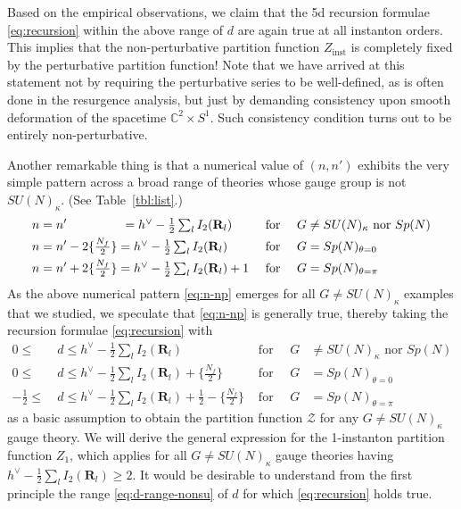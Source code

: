 \documentclass[letterpaper, 11pt]{article}
\newcommand{\nn}{\nonumber}
\def\IC{\mathbb{C}}
\def\k{\kappa}
\begin{document}
{Based on the empirical observations, we claim that the 5d recursion formulae \eqref{eq:recursion} within the above range of $d$ are again true at all instanton orders. This implies that the non-perturbative partition function $Z_\text{inst}$ is completely fixed by the perturbative partition function! Note that we have arrived at this statement not by requiring the perturbative series to be well-defined, as is often done in the resurgence analysis, but just by demanding consistency upon smooth deformation of the spacetime $\IC^2 \times S^1$. Such consistency condition turns out to be entirely non-perturbative.


Another remarkable thing is that a numerical value of  $(n, n')$ exhibits the very simple pattern across a broad range of theories whose gauge group is not $SU(N)_\k$. (See Table~\ref{tbl:list}.)
\begin{align}
  \label{eq:n-np}
 &n = n' \hspace{1.55cm}=\textstyle h^\vee - \frac{1}{2} \sum_{l}I_2(\mathbf{R}_l)  && \text{ for } \quad   G\neq SU(N)_\kappa \text{ nor } Sp(N) \nn\\
 &n = n' - 2\{\tfrac{N_f}{2}\} =\textstyle h^\vee - \frac{1}{2} \sum_{l}I_2(\mathbf{R}_l)
 &&   \text{ for }  \quad G = Sp(N)_{\theta=0}\\
 &n = n' + 2\{\tfrac{N_f}{2}\} =\textstyle h^\vee - \frac{1}{2} \sum_{l}I_2(\mathbf{R}_l) + 1 &&   \text{ for }  \quad G = Sp(N)_{\theta=\pi}\nn
\end{align}
As the above numerical pattern \eqref{eq:n-np} emerges for all $G \neq SU(N)_\k$ examples that we studied, we speculate that \eqref{eq:n-np} is generally true, thereby taking the recursion formulae \eqref{eq:recursion} with
\begin{align}
  \label{eq:d-range-nonsu}
  0 \leq &\ \textstyle d \leq h^\vee - \frac{1}{2} \sum_{l}I_2(\mathbf{R}_l) &\text{ for } \quad G &\neq SU(N)_\kappa \text{ nor } Sp(N) \nn \\
  0 \leq &\ \textstyle d \leq h^\vee - \frac{1}{2} \sum_{l}I_2(\mathbf{R}_l) + \{\tfrac{N_f}{2}\} &\text{ for }\quad G &=Sp(N)_{\theta=0} \\
  -\tfrac{1}{2} \leq &\ \textstyle d \leq h^\vee - \frac{1}{2} \sum_{l}I_2(\mathbf{R}_l) + \tfrac{1}{2} - \{\tfrac{N_f}{2}\} &\text{ for }\quad G &=Sp(N)_{\theta=\pi} \nn
\end{align}
as a basic assumption to obtain the partition function $\mathcal{Z}$ for any $G \neq SU(N)_\k$ gauge theory. 
We will derive the general expression for the 1-instanton partition function $Z_1$, which applies for all $G \neq SU(N)_\k$ gauge theories having $h^\vee - \frac{1}{2} \sum_{l}I_2(\mathbf{R}_l) \geq 2$.
It would be desirable to understand from the first principle the range  \eqref{eq:d-range-nonsu} of $d$ for which \eqref{eq:recursion} holds true.

}
\end{document}
